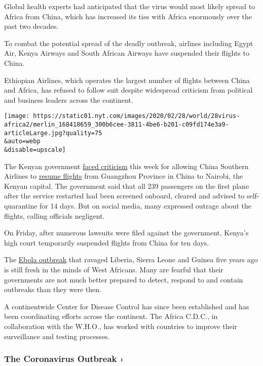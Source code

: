 Global health experts had anticipated that the virus would most likely
spread to Africa from China, which has increased its ties with Africa
enormously over the past two decades.

To combat the potential spread of the deadly outbreak, airlines
including Egypt Air, Kenya Airways and South African Airways have
suspended their flights to China.

Ethiopian Airlines, which operates the largest number of flights between
China and Africa, has refused to follow suit despite widespread
criticism from political and business leaders across the continent.

\texttt{[image: https://static01.nyt.com/images/2020/02/28/world/28virus-africa2/merlin\_168418659\_300b6cee-3811-4be6-b201-c09fd174e3a9-articleLarge.jpg?quality=75\\\&auto=webp\\\&disable=upscale]}

The Kenyan government
\href{https://twitter.com/dailynation/status/1233224185444552704}{faced
criticism} this week for allowing China Southern Airlines to
\href{https://twitter.com/MOH_Kenya/status/1232735617446010881}{resume
flights} from Guangzhou Province in China to Nairobi, the Kenyan
capital. The government said that all 239 passengers on the first plane
after the service restarted had been screened onboard, cleared and
advised to self-quarantine for 14 days. But on social media, many
expressed outrage about the flights, calling officials negligent.

On Friday, after numerous lawsuits were filed against the government,
Kenya's high court temporarily suspended flights from China for ten
days.

The
\href{https://www.nytimes.com/topic/subject/the-ebola-outbreak-in-west-africa}{Ebola
outbreak} that ravaged Liberia, Sierra Leone and Guinea five years ago
is still fresh in the minds of West Africans. Many are fearful that
their governments are not much better prepared to detect, respond to and
contain outbreaks than they were then.

A continentwide Center for Disease Control has since been established
and has been coordinating efforts across the continent. The Africa
C.D.C., in collaboration with the W.H.O., has worked with countries to
improve their surveillance and testing processes.

\href{https://www.nytimes.com/news-event/coronavirus?action=click\&pgtype=Article\&state=default\&region=MAIN_CONTENT_3\&context=storylines_faq}{}

\hypertarget{the-coronavirus-outbreak-}{%
\subsubsection{The Coronavirus Outbreak
›}\label{the-coronavirus-outbreak-}}

